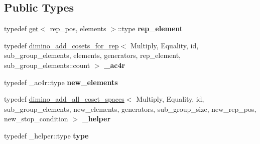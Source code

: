 \subsection*{Public Types}
\begin{DoxyCompactItemize}
\item 
\mbox{\label{struct_eigen_1_1internal_1_1group__theory_1_1dimino__add__all__coset__spaces_aa5f76c188f2a5cc5c5d165dd95862ed6}} 
typedef \hyperlink{struct_eigen_1_1internal_1_1get}{get}$<$ rep\+\_\+pos, elements $>$\+::type {\bfseries rep\+\_\+element}
\item 
\mbox{\label{struct_eigen_1_1internal_1_1group__theory_1_1dimino__add__all__coset__spaces_ad4f264915b6d925e40aa978cd2be7567}} 
typedef \hyperlink{struct_eigen_1_1internal_1_1group__theory_1_1dimino__add__cosets__for__rep}{dimino\+\_\+add\+\_\+cosets\+\_\+for\+\_\+rep}$<$ Multiply, Equality, id, sub\+\_\+group\+\_\+elements, elements, generators, rep\+\_\+element, sub\+\_\+group\+\_\+elements\+::count $>$ {\bfseries \+\_\+ac4r}
\item 
\mbox{\label{struct_eigen_1_1internal_1_1group__theory_1_1dimino__add__all__coset__spaces_af0fa4e28d09354873ed510ad7b4740dd}} 
typedef \+\_\+ac4r\+::type {\bfseries new\+\_\+elements}
\item 
\mbox{\label{struct_eigen_1_1internal_1_1group__theory_1_1dimino__add__all__coset__spaces_af5fa0b2b68ccfaa023d6113753a986df}} 
typedef \hyperlink{struct_eigen_1_1internal_1_1group__theory_1_1dimino__add__all__coset__spaces}{dimino\+\_\+add\+\_\+all\+\_\+coset\+\_\+spaces}$<$ Multiply, Equality, id, sub\+\_\+group\+\_\+elements, new\+\_\+elements, generators, sub\+\_\+group\+\_\+size, new\+\_\+rep\+\_\+pos, new\+\_\+stop\+\_\+condition $>$ {\bfseries \+\_\+helper}
\item 
\mbox{\label{struct_eigen_1_1internal_1_1group__theory_1_1dimino__add__all__coset__spaces_a75320f83307a37a34ab998b899c0af2c}} 
typedef \+\_\+helper\+::type {\bfseries type}

\end{DoxyCompactItemize}
